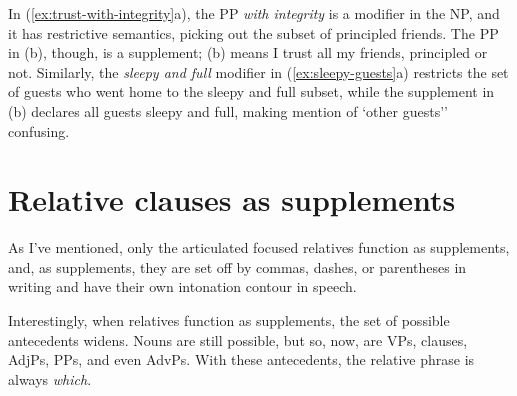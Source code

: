 In (\ref{ex:trust-with-integrity}a), the PP \textit{with integrity} is a modifier in the NP, and it has restrictive semantics, picking out the subset of principled friends. The PP in (b), though, is a supplement; (b) means I trust all my friends, principled or not. Similarly, the \textit{sleepy and full} modifier in (\ref{ex:sleepy-guests}a) restricts the set of guests who went home to the sleepy and full subset, while the supplement in (b) declares all guests sleepy and full, making mention of `other guests'' confusing.

\section{Relative clauses as supplements} \label{sec:rel-clause-supps}

As I've mentioned, only the articulated focused relatives function as supplements, and, as supplements, they are set off by commas, dashes, or parentheses in writing and have their own intonation contour in speech.

\ea
    \z
\z

Interestingly, when relatives function as supplements, the set of possible antecedents widens. Nouns are still possible, but so, now, are VPs, clauses, AdjPs, PPs, and even AdvPs. With these antecedents, the relative phrase is always \textit{which}.

\ea
    \z
\z
{}

